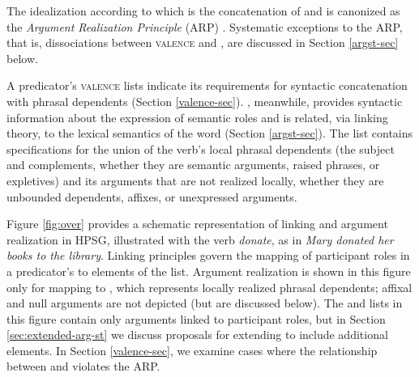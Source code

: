 \documentclass[output=paper
                ,modfonts
                ,nonflat
	        ,collection
	        ,collectionchapter
	        ,collectiontoclongg
 	        ,biblatex
                ,babelshorthands
                ,newtxmath
                ,draftmode
                ,colorlinks, citecolor=brown
]{./langsci/langscibook}
\begin{document}
\noindent
The idealization according to which \argst is the concatenation of \subj and \comps is canonized as the \emph{Argument Realization Principle} (ARP)  \citep[494]{SWB2003a}.  Systematic exceptions to the ARP, that is, dissociations between \textsc{valence} and \argst, are discussed in Section \ref{argst-sec} below.  

A predicator's \textsc{valence} lists indicate its requirements for syntactic concatenation with phrasal dependents (Section \ref{valence-sec}). 
\argst, meanwhile, provides syntactic information about the expression of semantic roles and is related, via linking theory, to the lexical semantics of the word (Section \ref{argst-sec}).  
The \argst list contains specifications for the union of the verb's local phrasal dependents (the subject and complements, whether they are semantic arguments, raised phrases, or expletives) and its arguments that are not realized locally, whether they are unbounded dependents, affixes, or unexpressed arguments. 

Figure \ref{fig:over} provides a schematic representation of %
linking and argument realization in HPSG,  illustrated with the verb \textit{donate}, as in \textit{Mary donated her books to the library}.   Linking principles govern the mapping of participant roles in a predicator's \content to %
elements of the \argst list.   Argument realization is shown in this figure only for mapping to \val, which represents locally realized phrasal dependents; affixal and null arguments are not depicted (but are discussed below).
The \argst and \val lists in this figure contain only arguments linked to participant roles,   but in Section \ref{sec:extended-arg-st} we discuss proposals for extending \argst to include additional elements.
In Section \ref{valence-sec}, we examine cases where the relationship between \argst and \val violates the ARP.
\end{document}
